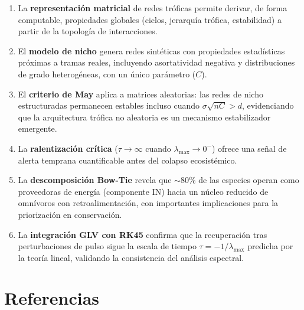 \documentclass[12pt, a4paper]{article}
\newcommand{\Req}{\lambda_{\max}}
\begin{document}
\begin{enumerate}
    \item La \textbf{representación matricial} de redes tróficas permite derivar, de
          forma computable, propiedades globales (ciclos, jerarquía trófica, estabilidad)
          a partir de la topología de interacciones.

    \item El \textbf{modelo de nicho} genera redes sintéticas con propiedades
          estadísticas próximas a tramas reales, incluyendo asortatividad negativa y
          distribuciones de grado heterogéneas, con un único parámetro ($C$).

    \item El \textbf{criterio de May} aplica a matrices aleatorias: las redes de nicho
          estructuradas permanecen estables incluso cuando $\sigma\sqrt{nC} > d$,
          evidenciando que la arquitectura trófica no aleatoria es un mecanismo
          estabilizador emergente.

    \item La \textbf{ralentización crítica} ($\tau \to \infty$ cuando $\Req \to 0^-$)
          ofrece una señal de alerta temprana cuantificable antes del colapso
          ecosistémico.

    \item La \textbf{descomposición Bow-Tie} revela que $\sim 80$\% de las especies
          operan como proveedoras de energía (componente IN) hacia un núcleo reducido
          de omnívoros con retroalimentación, con importantes implicaciones para la
          priorización en conservación.

    \item La \textbf{integración GLV con RK45} confirma que la recuperación tras
          perturbaciones de pulso sigue la escala de tiempo $\tau = -1/\Req$ predicha
          por la teoría lineal, validando la consistencia del análisis espectral.
\end{enumerate}

\section*{Referencias}
\end{document}
